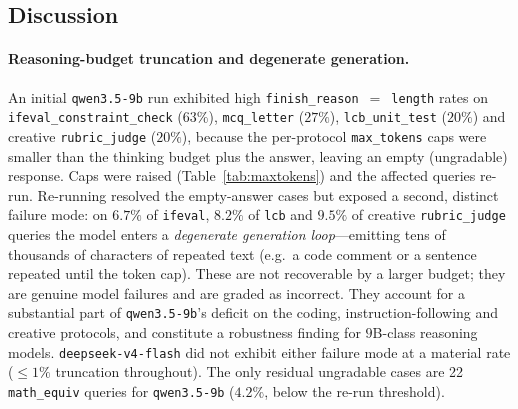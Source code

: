 \documentclass[11pt,a4paper]{article}
\begin{document}
\subsection{Discussion}\label{sec:eval-truncation}

\paragraph{Reasoning-budget truncation and degenerate generation.}
An initial \texttt{qwen3.5-9b} run exhibited high \texttt{finish\_reason}~$=$~\texttt{length}
rates on \texttt{ifeval\_constraint\_check} ($63\%$), \texttt{mcq\_letter}
($27\%$), \texttt{lcb\_unit\_test} ($20\%$) and creative \texttt{rubric\_judge}
($20\%$), because the per-protocol \texttt{max\_tokens} caps were smaller than the
thinking budget plus the answer, leaving an empty (ungradable) response. Caps
were raised (Table~\ref{tab:maxtokens}) and the affected queries re-run.
Re-running resolved the empty-answer cases but exposed a second, distinct failure
mode: on $6.7\%$ of \texttt{ifeval}, $8.2\%$ of \texttt{lcb} and $9.5\%$ of
creative \texttt{rubric\_judge} queries the model enters a \emph{degenerate
generation loop}---emitting tens of thousands of characters of repeated text
(e.g.\ a code comment or a sentence repeated until the token cap). These are not
recoverable by a larger budget; they are genuine model failures and are graded as
incorrect. They account for a substantial part of \texttt{qwen3.5-9b}'s deficit
on the coding, instruction-following and creative protocols, and constitute a
robustness finding for $9$B-class reasoning models. \texttt{deepseek-v4-flash}
did not exhibit either failure mode at a material rate ($\le 1\%$ truncation
throughout). The only residual ungradable cases are 22 \texttt{math\_equiv}
queries for \texttt{qwen3.5-9b} ($4.2\%$, below the re-run threshold).
\end{document}
